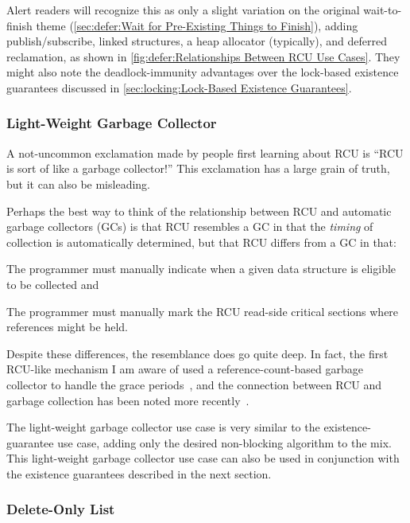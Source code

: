 Alert readers will recognize this as only a slight variation on
the original wait-to-finish theme
(\cref{sec:defer:Wait for Pre-Existing Things to Finish}),
adding publish/subscribe, linked structures, a heap allocator
(typically), and deferred reclamation, as shown in
\cref{fig:defer:Relationships Between RCU Use Cases}.
They might also note the deadlock-immunity advantages over the lock-based
existence guarantees discussed in
\cref{sec:locking:Lock-Based Existence Guarantees}.

\subsubsection{Light-Weight Garbage Collector}
\label{sec:defer:Light-Weight Garbage Collector}

A not-uncommon exclamation made by people first learning about
RCU is ``RCU is sort of like a garbage collector!''
This exclamation has a large grain of truth, but it can also be
misleading.

Perhaps the best way to think of the relationship between RCU
and automatic garbage collectors (GCs) is that RCU resembles
a GC in that the \emph{timing} of collection is automatically
determined, but that RCU differs from a GC in that:
\begin{enumerate*}[(1)]
\item The programmer must manually indicate when a given data
structure is eligible to be collected and
\item The programmer must manually mark the RCU read-side critical
sections where references might be held.
\end{enumerate*}

Despite these differences, the resemblance does go quite deep.
In fact, the first RCU-like mechanism I am aware of used a
reference-count-based garbage collector to handle the grace
periods~\cite{Kung80}, and the connection between RCU and
garbage collection has been noted more
recently~\cite{HarshalSheth2016goRCU}.

The light-weight garbage collector use case is very similar to
the existence-guarantee use case, adding only the desired non-blocking
algorithm to the mix.
This light-weight garbage collector use case can also be used in
conjunction with the existence guarantees described in the next section.

\subsubsection{Delete-Only List}
\label{sec:defer:Delete-Only List}

